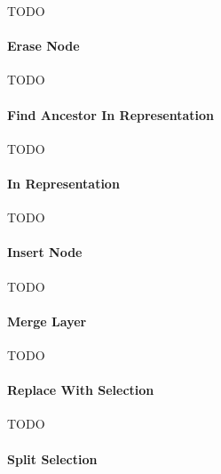 TODO

\paragraph{Erase Node}

TODO

\paragraph{Find Ancestor In Representation}

TODO

\paragraph{In Representation}

TODO

\paragraph{Insert Node}

TODO

\paragraph{Merge Layer}

TODO

\paragraph{Replace With Selection}

TODO

\paragraph{Split Selection}

